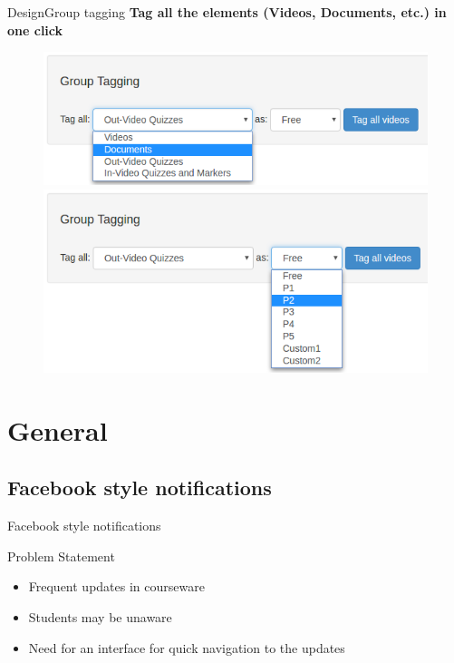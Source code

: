 \documentclass[xcolor=table]{beamer}
\begin{document}
\begin{frame}{Design}{Group tagging}
\textbf{Tag all the elements (Videos, Documents, etc.) in one click}
	\begin{figure}
	\centering
	\includegraphics[width=0.6\linewidth]{media/gt1} \\
	\includegraphics[width=0.6\linewidth]{media/gt2}
	\label{fig:gt}
	\end{figure}
\end{frame}

\section{General}

\subsection{Facebook style notifications}

\begin{frame}{Facebook style notifications}
	\begin{block}{Problem Statement}
	\begin{itemize}
		\item Frequent updates in courseware
		\item Students may be unaware
		\item Need for an interface for quick navigation to the updates
	\end{itemize}
	\end{block}
\end{frame}
\end{document}

